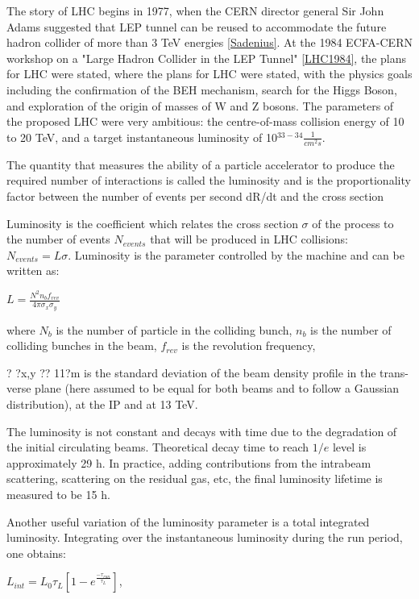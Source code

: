 The story of LHC begins in 1977, when the CERN director general Sir John Adams suggested that LEP tunnel can be reused to accommodate the future hadron collider of more than 3 TeV energies \ref{Sadenius}. At the 1984 ECFA-CERN workshop on a "Large Hadron Collider in the LEP Tunnel" \ref{LHC1984}, the plans for LHC were stated, where the plans for LHC were stated, with the physics goals including the confirmation of the BEH mechanism, search for the Higgs Boson, and exploration of the origin of masses of W and Z bosons. The parameters of the proposed LHC were very ambitious: the centre-of-mass collision energy of 10 to 20 TeV, and a target instantaneous luminosity of 10$^{33-34}\frac{1}{cm^{2}s}$. 



The quantity that measures the ability of a particle accelerator to produce the required number of interactions is called the luminosity and is the proportionality factor between the number of events per second dR/dt and the cross section \cite{Herr:941318}



Luminosity is the coefficient which relates the cross section $\sigma$ of the process to the number of events $N_{events}$ that will be produced in  LHC collisions: $N_{events} = L \sigma$. Luminosity is the parameter controlled by the machine and can be written as:

$L=\frac{N^2 n_b f_{rev}}{4\pi \sigma_x \sigma_y}$

\noindent where $N_b$ is the number of particle in the colliding bunch, $n_b$ is the number of colliding bunches in the beam, $f_{rev}$ is the revolution frequency, 

? ?x,y ?? 11?m is the standard deviation of the beam density profile in the trans-
verse plane (here assumed to be equal for both beams and to follow a Gaussian 
distribution), at the IP and at 13 TeV.

The luminosity is not constant and decays with time due to the degradation of the initial circulating beams. Theoretical decay time to reach $1/e$ level is approximately 29 h. In practice, adding contributions from the intrabeam scattering, scattering on the residual gas, etc, the final luminosity lifetime is measured to be 15 h. 

Another useful variation of the luminosity parameter is a total integrated luminosity. Integrating over the instantaneous luminosity during the run period, one obtains: 

 $L_{int} = L_0 \tau_L \left[  1- e^{\frac{-\tau_{run}}{\tau_L}}  \right]$, 

